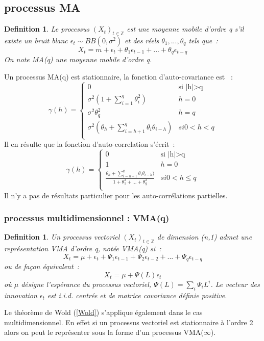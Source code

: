 \documentclass[11pt]{scrartcl} %
\newtheorem{Def}[theorem]{Definition}
\newcommand{\Xt}{\left(X_t\right)_{t\in\mathbb{Z}}}
\begin{document}
\subsection{processus MA}
\begin{Def}
Le processus $\Xt$ est une moyenne mobile d'ordre q s'il existe un bruit blanc $\epsilon_t\sim BB(0,\sigma^2)$ et des réels $\theta_1,...,\theta_q$ tels que~:~
$$
X_t=m+\epsilon_t+\theta_1\epsilon_{t-1}+...+\theta_q\epsilon_{t-q}
$$ 
On note MA(q) une moyenne mobile d'ordre q.
\end{Def}
Un processus MA(q) est stationnaire, la fonction d'auto-covariance est ~:
$$
\gamma(h)=\left\{\begin{array}{cc}
0 & \textrm{si |h|>q}\\
\sigma^2(1+\sum_{i=1}^q\theta^2_i) & h=0\\
\sigma^2 \theta^2_q & h=q\\
\sigma^2(\theta_h+\sum_{i=h+1}^q\theta_i\theta_{i-h}) & si 0<h<q\\
\end{array}
\right.
$$
Il en résulte que la fonction d'auto-correlation s'écrit~:
$$
\gamma(h)=\left\{\begin{array}{cc}
0 & \textrm{si |h|>q}\\
1 & h=0\\
\frac{\theta_h+\sum_{i=h+1}^q\theta_i\theta_{i-h})}{1+\theta_1^2+...+\theta_q^2} & si 0<h\leq q\\
\end{array}
\right.
$$
Il n'y a pas de résultats particulier pour les auto-corrélations partielles.
\subsubsection{processus multidimensionnel : VMA(q)}
\begin{Def}
Un processus vectoriel $\Xt$ de dimension (n,1) admet une représentation VMA d'ordre q, notée VMA(q) si~:
$$
X_t = \mu + \epsilon_t +\Psi_1\epsilon_{t-1}+\Psi_2\epsilon_{t-2}+...+ \Psi_q\epsilon_{t-q}
$$
ou de façon équivalent~:
$$
X_t = \mu+\Psi(L)\epsilon_t
$$
où $\mu$ désigne l'espérance du processus vectoriel, $\Psi(L)=\sum_i\Psi_iL^i$. Le vecteur des innovation $\epsilon_t$ est i.i.d. centrée et de matrice covariance définie positive.
\end{Def}


Le théorème de Wold (\ref{Wold}) s'applique également dans le cas multidimensionnel. En effet si un processus vectoriel est stationnaire à l'ordre 2 alors on peut le représenter sous la forme d'un processus VMA($\infty$).
\end{document}
